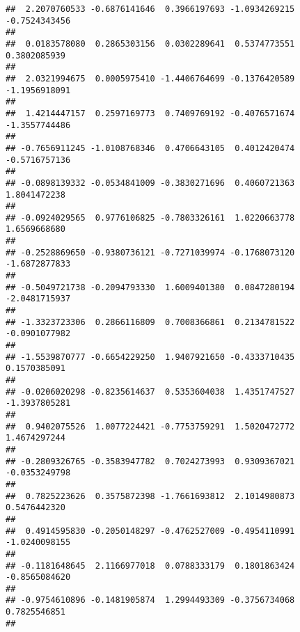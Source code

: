 \documentclass[]{article}
\begin{document}
\begin{verbatim}
##  2.2070760533 -0.6876141646  0.3966197693 -1.0934269215 -0.7524343456 
##                                                                       
##  0.0183578080  0.2865303156  0.0302289641  0.5374773551  0.3802085939 
##                                                                       
##  2.0321994675  0.0005975410 -1.4406764699 -0.1376420589 -1.1956918091 
##                                                                       
##  1.4214447157  0.2597169773  0.7409769192 -0.4076571674 -1.3557744486 
##                                                                       
## -0.7656911245 -1.0108768346  0.4706643105  0.4012420474 -0.5716757136 
##                                                                       
## -0.0898139332 -0.0534841009 -0.3830271696  0.4060721363  1.8041472238 
##                                                                       
## -0.0924029565  0.9776106825 -0.7803326161  1.0220663778  1.6569668680 
##                                                                       
## -0.2528869650 -0.9380736121 -0.7271039974 -0.1768073120 -1.6872877833 
##                                                                       
## -0.5049721738 -0.2094793330  1.6009401380  0.0847280194 -2.0481715937 
##                                                                       
## -1.3323723306  0.2866116809  0.7008366861  0.2134781522 -0.0901077982 
##                                                                       
## -1.5539870777 -0.6654229250  1.9407921650 -0.4333710435  0.1570385091 
##                                                                       
## -0.0206020298 -0.8235614637  0.5353604038  1.4351747527 -1.3937805281 
##                                                                       
##  0.9402075526  1.0077224421 -0.7753759291  1.5020472772  1.4674297244 
##                                                                       
## -0.2809326765 -0.3583947782  0.7024273993  0.9309367021 -0.0353249798 
##                                                                       
##  0.7825223626  0.3575872398 -1.7661693812  2.1014980873  0.5476442320 
##                                                                       
##  0.4914595830 -0.2050148297 -0.4762527009 -0.4954110991 -1.0240098155 
##                                                                       
## -0.1181648645  2.1166977018  0.0788333179  0.1801863424 -0.8565084620 
##                                                                       
## -0.9754610896 -0.1481905874  1.2994493309 -0.3756734068  0.7825546851 
##                                                                       

\end{verbatim}
\end{document}
